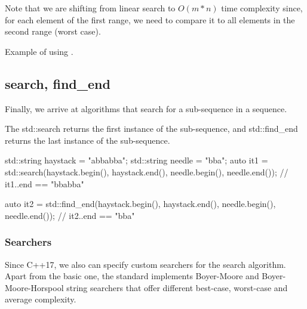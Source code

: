

Note that we are shifting from linear search to $O(m*n)$ time complexity since, for each element of the first range, we need to compare it to all elements in the second range (worst case).

\begin{box-note}
\footnotesize Example of using .
\tcblower
{}
\end{box-note}

\subsection{search, find\_end}

Finally, we arrive at algorithms that search for a sub-sequence in a sequence.



The std::search returns the first instance of the sub-sequence, and std::find\_end returns the last instance of the sub-sequence.

\begin{box-note}
\begin{cppcode}
std::string haystack = "abbabba";
std::string needle = "bba";
auto it1 = std::search(haystack.begin(), haystack.end(), 
                       needle.begin(), needle.end());
// it1..end == "bbabba"

auto it2 = std::find_end(haystack.begin(), haystack.end(), 
                         needle.begin(), needle.end());
// it2..end == "bba"
\end{cppcode}
\end{box-note}

\subsubsection{Searchers}

Since C++17, we also can specify custom searchers for the search algorithm. Apart from the basic one, the standard implements Boyer-Moore and Boyer-Moore-Horspool string searchers that offer different best-case, worst-case and average complexity.

